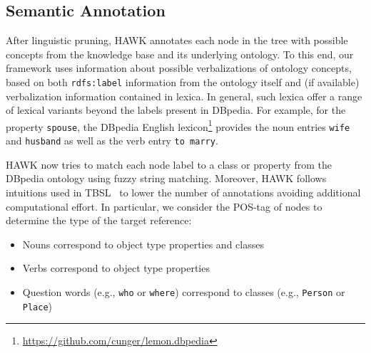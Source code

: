 


\subsection{Semantic Annotation}
After linguistic pruning, HAWK annotates each node in the tree with possible concepts from the knowledge base and its underlying ontology.
To this end, our framework uses information about possible verbalizations of ontology concepts, based on both \texttt{rdfs:label} information from the ontology itself and (if available) verbalization information contained in lexica.
In general, such lexica offer a range of lexical variants beyond the labels present in DBpedia. For example, for the property \texttt{spouse}, the DBpedia English lexicon\footnote{\url{https://github.com/cunger/lemon.dbpedia}} provides the noun entries \texttt{wife} and \texttt{husband} as well as the verb entry \texttt{to marry}.


HAWK now tries to match each node label to a class or property from the DBpedia ontology using fuzzy string matching.
Moreover, HAWK follows intuitions used in TBSL~\cite{template} to lower the number of annotations avoiding additional computational effort. 
In particular, we consider the POS-tag of nodes to determine the type of the target reference:
\begin{itemize}
\item Nouns correspond to object type properties and classes
\item Verbs correspond to object type properties
\item Question words (e.g., \texttt{who} or \texttt{where}) correspond to classes (e.g., \texttt{Person} or \texttt{Place})
\end{itemize}

